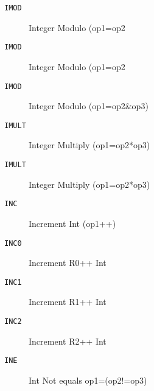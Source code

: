 \begin{description}
\item[\texttt{IMOD}]  Integer Modulo (op1=op2%

\end{description}
\begin{description}
\item[\texttt{IMOD}]  Integer Modulo (op1=op2%

\end{description}
\begin{description}
\item[\texttt{IMOD}]  Integer Modulo (op1=op2\&op3)\\

\end{description}
\begin{description}
\item[\texttt{IMULT}]  Integer Multiply (op1=op2*op3)\\

\end{description}
\begin{description}
\item[\texttt{IMULT}]  Integer Multiply (op1=op2*op3)\\

\end{description}
\begin{description}
\item[\texttt{INC}]  Increment Int (op1++)\\

\end{description}
\begin{description}
\item[\texttt{INC0}]  Increment R0++ Int\\

\end{description}
\begin{description}
\item[\texttt{INC1}]  Increment R1++ Int\\

\end{description}
\begin{description}
\item[\texttt{INC2}]  Increment R2++ Int\\

\end{description}
\begin{description}
\item[\texttt{INE}]  Int Not equals op1=(op2!=op3)\\

\end{description}
